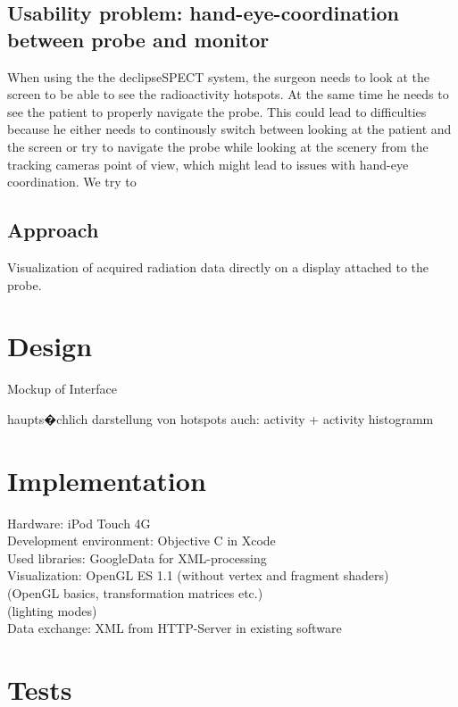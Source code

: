 \documentclass{scrartcl}
\begin{document}
\subsection{Usability problem: hand-eye-coordination between probe and monitor}


When using the the declipseSPECT system, the surgeon needs to look at the screen to be able to see the radioactivity hotspots. At the same time he needs to see the patient to properly navigate the probe. This could lead to difficulties because he either needs to continously switch between looking at the patient and the screen or try to navigate the probe while looking at the scenery from the tracking cameras point of view, which might lead to issues with hand-eye coordination.
We try to 

\subsection{Approach}
Visualization of acquired radiation data directly on a display attached to the probe.

\section{Design}

Mockup of Interface

haupts�chlich darstellung von hotspots
auch: activity + activity histogramm

\section{Implementation}

Hardware: iPod Touch 4G\\
Development environment: Objective C in Xcode\\
Used libraries: GoogleData for XML-processing\\
Visualization: OpenGL ES 1.1 (without vertex and fragment shaders)\\
(OpenGL basics, transformation matrices etc.)\\
(lighting modes)\\
Data exchange: XML from HTTP-Server in existing software\\

\section{Tests}
\end{document}
